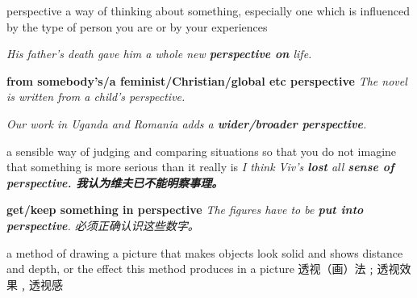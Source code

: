 \begin{RefWord}{perspective}
    a way of thinking about something, especially one which is influenced by the type of person you are or by your experiences

    \textit{His father’s death gave him a whole new \textbf{perspective on} life.}
    
    \textbf{from somebody’s/a feminist/Christian/global etc perspective}
    \textit{The novel is written from a child’s perspective.}

    \textit{Our work in Uganda and Romania adds a \textbf{wider/broader perspective}.}

    a sensible way of judging and comparing situations so that you do not imagine that something is more serious than it really is
    \textit{I think Viv’s \textbf{lost} all \textbf{sense of perspective. 我认为维夫已不能明察事理。}}

    \textbf{get/keep something in perspective}
    \textit{The figures have to be \textbf{put into perspective}. 必须正确认识这些数字。}

    a method of drawing a picture that makes objects look solid and shows distance and depth, or the effect this method produces in a picture 透视（画）法﹔透视效果﹐透视感
\end{RefWord}

